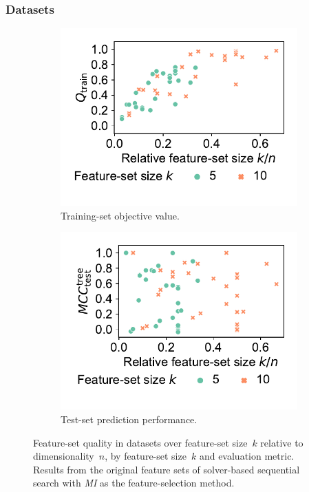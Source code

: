 \documentclass{article}
\theoremstyle{definition}
\begin{document}
\subsubsection{Datasets}
\label{sec:afs:appendix:evaluation:datasets}

\begin{figure}[t]
	\centering
	\begin{subfigure}[t]{0.48\textwidth}
		\centering
		\includegraphics[width=\textwidth, trim=15 30 15 15, clip]{plots/afs-impact-dataset-k-train-objective.pdf}
		\caption{Training-set objective value.}
		\label{fig:afs:impact-dataset-k-train-objective}
	\end{subfigure}
	\hfill
	\begin{subfigure}[t]{0.48\textwidth}
		\centering
		\includegraphics[width=\textwidth, trim=15 30 15 15, clip]{plots/afs-impact-dataset-k-decision-tree-test-mcc.pdf}
		\caption{Test-set prediction performance.}
		\label{fig:afs:impact-dataset-k-decision-tree-test-mcc}
	\end{subfigure}
	\caption{
		Feature-set quality in datasets over feature-set size~$k$ relative to dimensionality~$n$, by feature-set size~$k$ and evaluation metric.
		Results from the original feature sets of solver-based sequential search with \emph{MI} as the feature-selection method.
	}
	\label{fig:afs:impact-dataset-k-quality}
\end{figure}
\end{document}
